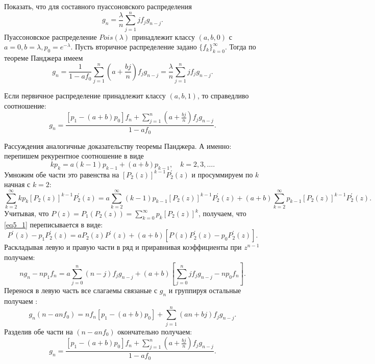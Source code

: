     \problem{}
        Показать, что для составного пуассоновского распределения 
        \begin{equation*}
            g_n = \frac{\lambda}{n}\sum\limits_{j=1}^n jf_jg_{n-j}.
        \end{equation*}
        \solution{}
            Пуассоновское распределение $Pois(\lambda)$ принадлежит классу $(a, b, 0)$ с $a=0, b=\lambda, p_0 = e^{-\lambda}$. Пусть вторичное распределение задано $\{f_k \}_{k=0}^\infty$. Тогда по теореме Панджера имеем
            \begin{equation*}
                g_n = \frac1{1 - af_0} \sum\limits_{j=1}^n ( a + \frac{bj}n)f_j g_{n-j} = \frac{\lambda}{n} \sum\limits_{j=1}^n jf_j g_{n-j}.
            \end{equation*}
    
    \problem{}
    Если первичное распределение принадлежит классу $(a,b,1)$, то справедливо соотношение:
    $$g_n =\frac{[p_1 - (a + b)p_0]f_n +\sum^n_{j=1}\left(a + \frac{bj}{n}\right)f_j g_{n-j}}{1 - af_0}.$$
        
        \solution{}
            Рассуждения аналогичные доказательству теоремы Панджера. А именно: перепишем рекурентное соотношение в виде 
            \begin{equation*}
                kp_k = a(k-1)p_{k-1} + (a+b)p_{k-1} ,\quad k=2,3,\ldots .
            \end{equation*}
            Умножим обе части это равенства на $[P_2(z)]^{k-1}P^\prime_2(z)$ и просуммируем по $k$ начная с $k=2$:
            \begin{equation} \label{eq5_1}
            \sum\limits_{k=2}^\infty kp_k[P_2(z)]^{k-1}P^\prime_2(z) = a \sum\limits_{k=2}^\infty (k-1)p_{k-1}[P_2(z)]^{k-1}P^\prime_2(z) + (a+b)\sum\limits_{k=2}^\infty p_{k-1}[P_2(z)]^{k-1}P^\prime_2(z).
            \end{equation}
            Учитывая, что $P(z)=P_1(P_2(z)) = \sum\limits_{k=0}^\infty p_k[P_2(z)]^k$, получаем, что \ref{eq5_1} переписывается в виде:
            \begin{equation*}
                P^\prime(z) - p_1P^\prime_2(z) = aP_2(z)P^\prime(z) + (a+b)\left[P(z)P^\prime_2(z) - p_0P^\prime_2(z) \right].
            \end{equation*}
            Раскладывая левую и правую части в ряд и приравнивая коэффициенты при $z^{n-1}$ получаем:
            \begin{equation*}
                ng_n - np_1f_n = a \sum_{j=0}^n(n-j)f_jg_{n-j} + (a+b)\left[ \sum_{j=0}^njf_jg_{n-j} - np_0f_n\right].
            \end{equation*}
            Перенося в левую часть все слагаемы связаные с $g_n$ и группируя остальные получаем :
            \begin{equation*}
                g_n(n -anf_0) = nf_n[p_1 - (a+b)p_0 ] +  \sum_{j=1}^n(an + bj)f_jg_{n-j}.
            \end{equation*}
            Разделив обе части на $(n -anf_0)$ окончательно получаем:
            \begin{equation*}
                g_n =\frac{[p_1 - (a + b)p_0]f_n +\sum^n_{j=1}\left(a + \frac{bj}{n}\right)f_j g_{n-j}}{1 - af_0}.
            \end{equation*}